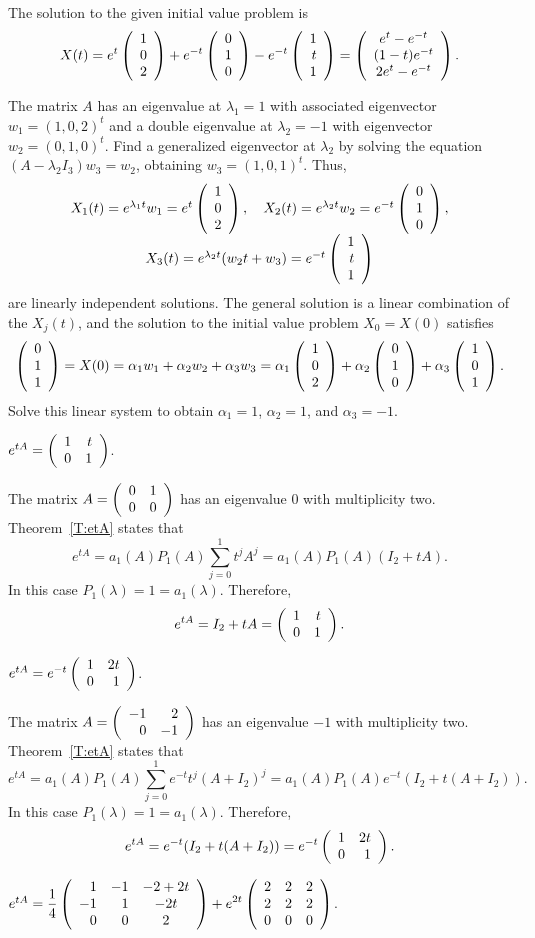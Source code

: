 \documentclass{ximera}
\begin{document}
 \ans The solution to the given initial value problem is
\[
X(t) = e^t\left(\begin{array}{r} 1 \\ 0 \\ 2\end{array}\right) + e^{-t}\left(\begin{array}{r} 0 \\ 1 \\ 0\end{array}\right) -
e^{-t}\left(\begin{array}{r} 1 \\ t \\ 1\end{array}\right) =
\left(\begin{array}{c} e^t - e^{-t} \\ (1 - t)e^{-t} \\ 2e^t - e^{-t}\end{array}\right).
\]

\soln The matrix $A$ has an eigenvalue at $\lambda_1 = 1$ with associated
eigenvector $w_1 = (1,0,2)^t$ and a double eigenvalue at $\lambda_2 = -1$
with eigenvector $w_2 = (0,1,0)^t$.  Find a generalized eigenvector at
$\lambda_2$ by solving the equation $(A - \lambda_2I_3)w_3 = w_2$, obtaining
$w_3 = (1,0,1)^t$.  Thus,
\[
\begin{array}{c}
X_1(t) = e^{\lambda_1 t}w_1 = e^{t}\left(\begin{array}{r} 1 \\ 0 \\ 2\end{array}\right), \quad
X_2(t) = e^{\lambda_2 t}w_2 = e^{-t}\left(\begin{array}{r} 0 \\ 1 \\ 0\end{array}\right), \\
X_3(t) = e^{\lambda_2 t}(w_2t + w_3) = e^{-t}\left(\begin{array}{r} 1 \\ t \\ 1\end{array}\right)
\end{array}
\]
are linearly independent solutions.  The general solution is a linear
combination of the $X_j(t)$, and the solution to the initial value
problem $X_0 = X(0)$ satisfies
\[
\left(\begin{array}{r} 0 \\ 1 \\ 1\end{array}\right) = X(0) = \alpha_1w_1 + \alpha_2w_2 + \alpha_3w_3
= \alpha_1\left(\begin{array}{r} 1 \\ 0 \\ 2\end{array}\right) + \alpha_2\left(\begin{array}{r} 0 \\ 1 \\ 0\end{array}\right)
+ \alpha_3\left(\begin{array}{r} 1 \\ 0 \\ 1\end{array}\right).
\]
Solve this linear system to obtain $\alpha_1 = 1$,
$\alpha_2 = 1$, and $\alpha_3 = -1$.

 \ans $e^{tA} = \left(\begin{array}{rr} 1 & t\\ 0 &1\end{array}\right)$.

\soln The matrix $A = \left(\begin{array}{rr} 0 & 1\\ 0 &0\end{array}\right)$ has an eigenvalue $0$ with
multiplicity two.  Theorem~\ref{T:etA} states that 
\[
e^{tA} = a_1(A)P_1(A)\sum_{j=0}^1t^jA^j= a_1(A)P_1(A)(I_2+tA).
\]
In this case $P_1(\lambda)=1=a_1(\lambda)$.   Therefore,
\[
e^{tA} = I_2+tA = \left(\begin{array}{rr} 1 & t\\ 0 &1\end{array}\right).
\]


 \ans $e^{tA} = e^{-t}\left(\begin{array}{rr} 1 & 2t\\ 0 &1\end{array}\right)$.

\soln The matrix $A = \left(\begin{array}{rr} -1 & 2\\ 0 &-1\end{array}\right)$ has an eigenvalue $-1$ with
multiplicity two.  Theorem~\ref{T:etA} states that 
\[
e^{tA} = a_1(A)P_1(A)\sum_{j=0}^1e^{-t}t^j(A+I_2)^j=
a_1(A)P_1(A)e^{-t}(I_2+t(A+I_2)).
\]
In this case $P_1(\lambda)=1=a_1(\lambda)$.   Therefore,
\[
e^{tA} = e^{-t}(I_2+t(A+I_2)) = e^{-t}\left(\begin{array}{rr} 1 & 2t\\ 0 &1\end{array}\right).
\]


 \ans $e^{tA}= \displaystyle\frac{1}{4}\left(\begin{array}{rrc} 
1 & -1 & -2+2t\\ -1 & 1 & -2t \\ 0 & 0 & 2\end{array}\right) +e^{2t}\left(\begin{array}{rrr} 2 & 2 & 2\\  2 & 2 & 2 \\ 0 & 0 & 0 
\end{array}\right)$.
\end{document}
